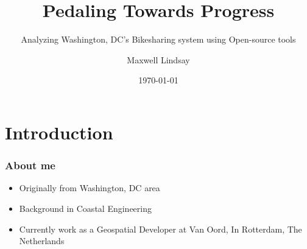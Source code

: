 \documentclass{beamer}
\title{Pedaling Towards Progress}
\subtitle{Analyzing Washington, DC's Bikesharing system using Open-source tools}
\author{Maxwell Lindsay}
\institute{Van Oord}
\date{\today}
\begin{document}
\begin{frame}
    \titlepage
\end{frame}
\section{Introduction}
\begin{frame}
    \frametitle{About me}
    \begin{itemize}
        \item Originally from Washington, DC area
        \item Background in Coastal Engineering
        \item Currently work as a Geospatial Developer at Van Oord, In Rotterdam, The Netherlands
    \end{itemize}
\end{frame}
\end{document}
